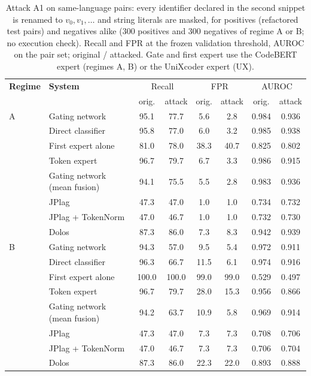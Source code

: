 \begin{table}[t]
\centering
\caption{Attack A1 on same-language pairs: every identifier declared in the second snippet is renamed to $v_0,v_1,\dots$ and string literals are masked, for positives (refactored test pairs) and negatives alike (300 positives and 300 negatives of regime A or B; no execution check). Recall and FPR at the frozen validation threshold, AUROC on the pair set; original / attacked. Gate and first expert use the CodeBERT expert (regimes A, B) or the UniXcoder expert (UX).}
\label{tab:attack}
\scriptsize
\setlength{\tabcolsep}{3pt}
\begin{tabular}{ll|cc|cc|cc}
\toprule
\textbf{Regime} & \textbf{System} & \multicolumn{2}{c|}{Recall} & \multicolumn{2}{c|}{FPR} & \multicolumn{2}{c}{AUROC} \\
 & & orig. & attack & orig. & attack & orig. & attack \\
\midrule
A & Gating network & 95.1 & 77.7 & 5.6 & 2.8 & 0.984 & 0.936 \\
 & Direct classifier & 95.8 & 77.0 & 6.0 & 3.2 & 0.985 & 0.938 \\
 & First expert alone & 81.0 & 78.0 & 38.3 & 40.7 & 0.825 & 0.802 \\
 & Token expert & 96.7 & 79.7 & 6.7 & 3.3 & 0.986 & 0.915 \\
 & Gating network (mean fusion) & 94.1 & 75.5 & 5.5 & 2.8 & 0.983 & 0.936 \\
 & JPlag & 47.3 & 47.0 & 1.0 & 1.0 & 0.734 & 0.732 \\
 & JPlag + TokenNorm & 47.0 & 46.7 & 1.0 & 1.0 & 0.732 & 0.730 \\
 & Dolos & 87.3 & 86.0 & 7.3 & 8.3 & 0.942 & 0.939 \\
\midrule
B & Gating network & 94.3 & 57.0 & 9.5 & 5.4 & 0.972 & 0.911 \\
 & Direct classifier & 96.3 & 66.7 & 11.5 & 6.1 & 0.974 & 0.916 \\
 & First expert alone & 100.0 & 100.0 & 99.0 & 99.0 & 0.529 & 0.497 \\
 & Token expert & 96.7 & 79.7 & 28.0 & 15.3 & 0.956 & 0.866 \\
 & Gating network (mean fusion) & 94.2 & 63.7 & 10.9 & 5.8 & 0.969 & 0.914 \\
 & JPlag & 47.3 & 47.0 & 7.3 & 7.3 & 0.708 & 0.706 \\
 & JPlag + TokenNorm & 47.0 & 46.7 & 7.3 & 7.3 & 0.706 & 0.704 \\
 & Dolos & 87.3 & 86.0 & 22.3 & 22.0 & 0.893 & 0.888 \\

\end{tabular}
\end{table}
